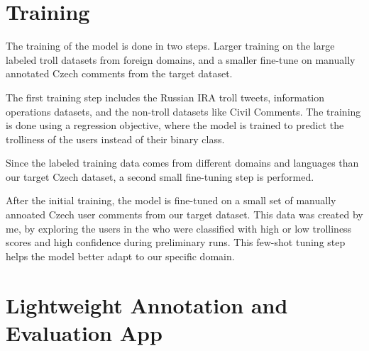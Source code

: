 \documentclass[twoside]{ctuthesis}
\theoremstyle{plain}
\theoremstyle{definition}
\theoremstyle{note}
\begin{document}
\section{Training}
The training of the model is done in two steps. Larger training on the large labeled troll datasets from foreign domains, and a smaller fine-tune on manually annotated Czech comments from the target dataset.\par
The first training step includes the Russian IRA troll tweets, information operations datasets, and the non-troll datasets like Civil Comments. The training is done using a regression objective, where the model is trained to predict the trolliness of the users instead of their binary class.\par
Since the labeled training data comes from different domains and languages than our target Czech dataset, a second small fine-tuning step is performed.\par
After the initial training, the model is fine-tuned on a small set of manually annoated Czech user comments from our target dataset. This data was created by me, by exploring the users in the who were classified with high or low trolliness scores and high confidence during preliminary runs. This few-shot tuning step helps the model better adapt to our specific domain.\par

\section{Lightweight Annotation and Evaluation App}
\end{document}

